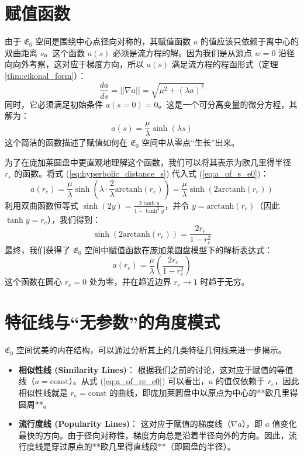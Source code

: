 \documentclass[a4paper,12pt]{book}
\numberwithin{problem}{section}
\numberwithin{definition}{section}
\numberwithin{lemma}{section}
\numberwithin{proposition}{section}
\numberwithin{theorem}{section}
\numberwithin{grammar}{section}
\numberwithin{program}{section}
\numberwithin{convention}{section}
\numberwithin{corollary}{section}
\begin{document}
\section{赋值函数}
\label{sec:e0_assignment_function}

由于 $\mathfrak{E}_0$ 空间是围绕中心点径向对称的，其赋值函数 $a$ 的值应该只依赖于离中心的双曲距离 $s$。这个函数 $a(s)$ 必须是流方程的解。因为我们是从源点 $w=0$ 沿径向向外考察，这对应于梯度方向，所以 $a(s)$ 满足流方程的程函形式（定理 \ref{thm:eikonal_form}）：
\[ \frac{da}{ds} = ||\nabla a|| = \sqrt{\mu^2 + (\lambda a)^2} \]
同时，它必须满足初始条件 $a(s=0)=0$。这是一个可分离变量的微分方程，其解为：
\begin{equation}
    a(s) = \frac{\mu}{\lambda} \sinh(\lambda s)
    \label{eq:a_of_s_e0}
\end{equation}
这个简洁的函数描述了赋值如何在 $\mathfrak{E}_0$ 空间中从零点“生长”出来。

为了在庞加莱圆盘中更直观地理解这个函数，我们可以将其表示为欧几里得半径 $r_e$ 的函数。将式 (\ref{eq:hyperbolic_distance_s}) 代入式 (\ref{eq:a_of_s_e0})：
\[
    a(r_e) = \frac{\mu}{\lambda} \sinh\left(\lambda \cdot \frac{2}{\lambda} \text{arctanh}(r_e)\right) = \frac{\mu}{\lambda} \sinh(2 \text{arctanh}(r_e))
\]
利用双曲函数恒等式 $\sinh(2y) = \frac{2\tanh y}{1-\tanh^2 y}$，并令 $y = \text{arctanh}(r_e)$（因此 $\tanh y = r_e$），我们得到：
\[
    \sinh(2 \text{arctanh}(r_e)) = \frac{2r_e}{1-r_e^2}
\]
最终，我们获得了 $\mathfrak{E}_0$ 空间中赋值函数在庞加莱圆盘模型下的解析表达式：
\begin{equation}
    a(r_e) = \frac{\mu}{\lambda} \left( \frac{2r_e}{1-r_e^2} \right)
    \label{eq:a_of_re_e0}
\end{equation}
这个函数在圆心 $r_e=0$ 处为零，并在趋近边界 $r_e \to 1$ 时趋于无穷。

\section{特征线与“无参数”的角度模式}
\label{sec:e0_characteristic_lines}

$\mathfrak{E}_0$ 空间优美的内在结构，可以通过分析其上的几类特征几何线来进一步揭示。

\begin{itemize}
    \item \textbf{相似性线 (Similarity Lines)}：
    根据我们之前的讨论，这对应于赋值的等值线（$a=\text{const}$）。从式 (\ref{eq:a_of_re_e0}) 可以看出，$a$ 的值仅依赖于 $r_e$，因此相似性线就是 $r_e=\text{const}$ 的曲线，即庞加莱圆盘中以原点为中心的**欧几里得圆周**。

    \item \textbf{流行度线 (Popularity Lines)}：
    这对应于赋值的梯度线（$\nabla a$），即 $a$ 值变化最快的方向。由于径向对称性，梯度方向总是沿着半径向外的方向。因此，流行度线是穿过原点的**欧几里得直线段**（即圆盘的半径）。
\end{itemize}
\end{document}
